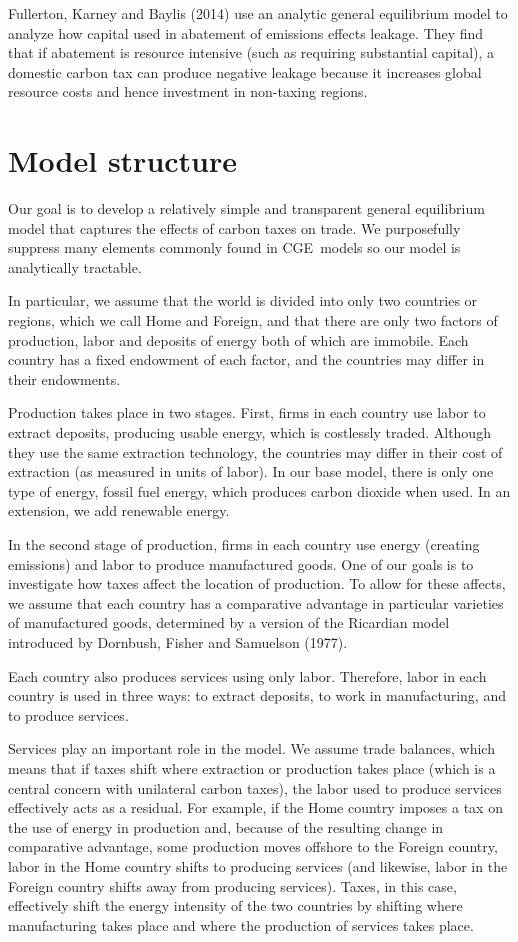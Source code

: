 \documentclass[notitlepage,12pt]{article}
\begin{document}
Fullerton, Karney and Baylis (2014) use an analytic general equilibrium
model to analyze how capital used in abatement of emissions effects leakage.
They find that if abatement is resource intensive (such as requiring
substantial capital), a domestic carbon tax can produce negative leakage
because it increases global resource costs and hence investment in
non-taxing regions.

\section{Model structure}

Our goal is to develop a relatively simple and transparent general
equilibrium model that captures the effects of carbon taxes on trade. We
purposefully suppress many elements commonly found in CGE\ models so our
model is analytically tractable.

In particular, we assume that the world is divided into only two countries
or regions, which we call Home and Foreign, and that there are only two
factors of production, labor and deposits of energy both of which are
immobile. Each country has a fixed endowment of each factor, and the
countries may differ in their endowments.

Production takes place in two stages. First, firms in each country use labor
to extract deposits, producing usable energy, which is costlessly traded.
Although they use the same extraction technology, the countries may differ
in their cost of extraction (as measured in units of labor). In our base
model, there is only one type of energy, fossil fuel energy, which produces
carbon dioxide when used. In an extension, we add renewable energy.

In the second stage of production, firms in each country use energy
(creating emissions) and labor to produce manufactured goods. One of our
goals is to investigate how taxes affect the location of production. To
allow for these affects, we assume that each country has a comparative
advantage in particular varieties of manufactured goods, determined by a
version of the Ricardian model introduced by Dornbush, Fisher and Samuelson
(1977).

Each country also produces services using only labor. Therefore, labor in
each country is used in three ways: to extract deposits, to work in
manufacturing, and to produce services.

Services play an important role in the model. We assume trade balances,
which means that if taxes shift where extraction or production takes place
(which is a central concern with unilateral carbon taxes), the labor used to
produce services effectively acts as a residual. For example, if the Home
country imposes a tax on the use of energy in production and, because of the
resulting change in comparative advantage, some production moves offshore to
the Foreign country, labor in the Home country shifts to producing services
(and likewise, labor in the Foreign country shifts away from producing
services). Taxes, in this case, effectively shift the energy intensity of
the two countries by shifting where manufacturing takes place and where the
production of services takes place.
\end{document}
